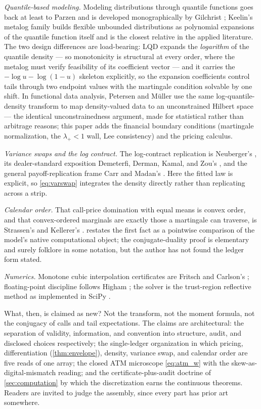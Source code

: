 \emph{Quantile-based modeling.}  Modeling distributions through
quantile functions goes back at least to Parzen \citep{Parzen1979} and
is developed monographically by Gilchrist \citep{Gilchrist2000}; Keelin's
metalog family \citep{Keelin2016} builds flexible unbounded
distributions as polynomial expansions of the quantile function itself
and is the closest relative in the applied literature.  The two design
differences are load-bearing: LQD expands the \emph{logarithm} of the
quantile density --- so monotonicity is structural at every order,
where the metalog must verify feasibility of its coefficient vector ---
and it carries the $-\log u-\log(1-u)$ skeleton explicitly, so the
expansion coefficients control tails through two endpoint values with
the martingale condition solvable by one shift.  In functional data
analysis, Petersen and M\"uller \citep{PetersenMuller2016} use the same
log-quantile-density transform to map density-valued data to an
unconstrained Hilbert space --- the identical unconstrainedness
argument, made for statistical rather than arbitrage reasons; this
paper adds the financial boundary conditions (martingale normalization,
the $\lambda_+<1$ wall, Lee consistency) and the pricing calculus.

\emph{Variance swaps and the log contract.}  The log-contract
replication is Neuberger's \citep{Neuberger1994}, its dealer-standard
exposition Demeterfi, Derman, Kamal, and Zou's
\citep{DemeterfiDermanKamalZou1999}, and the general payoff-replication
frame Carr and Madan's \citep{CarrMadan1998}.  Here the fitted law is
explicit, so \eqref{eq:varswap} integrates the density directly rather
than replicating across a strip.

\emph{Calendar order.}  That call-price domination with equal means is
convex order, and that convex-ordered marginals are exactly those a
martingale can traverse, is Strassen's and Kellerer's
\citep{Strassen1965,Kellerer1972}.   restates the
first fact as a pointwise comparison of the model's native
computational object; the conjugate-duality proof is elementary and
surely folklore in some notation, but the author has not found the
ledger form stated.

\emph{Numerics.}  Monotone cubic interpolation certificates are Fritsch
and Carlson's \citep{FritschCarlson1980}; floating-point discipline
follows Higham \citep{Higham2002}; the solver is the trust-region
reflective method \citep{BranchColemanLi1999} as implemented in SciPy
\citep{SciPy2020}.

What, then, is claimed as new?  Not the transform, not the moment
formula, not the conjugacy of calls and tail expectations.  The claims
are architectural: the separation of validity, information, and
convention into structure, audit, and disclosed choices respectively;
the single-ledger organization in which pricing, differentiation
(\cref{thm:envelope}), density, variance swap, and calendar order are
five reads of one array; the closed ATM microscope \eqref{eq:atm_w}
with the skew-as-digital-mismatch reading; and the certificate-plus-audit
doctrine of \cref{sec:computation} by which the discretization earns
the continuous theorems.  Readers are invited to judge the assembly,
since every part has prior art somewhere.
